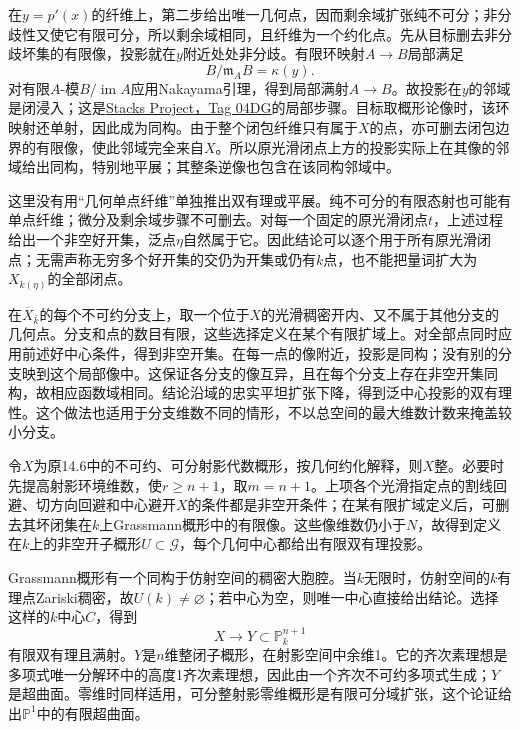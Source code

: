 在$y=p'(x)$的纤维上，第二步给出唯一几何点，因而剩余域扩张纯不可分；非分歧性又使它有限可分，所以剩余域相同，且纤维为一个约化点。先从目标删去非分歧坏集的有限像，投影就在$y$附近处处非分歧。有限环映射$A\to B$局部满足
\[
B/\mathfrak m_A B=\kappa(y).
\]
对有限$A$-模$B/\operatorname{im}A$应用Nakayama引理，得到局部满射$A\to B$。故投影在$y$的邻域是闭浸入；这是\href{https://stacks.math.columbia.edu/tag/04DG}{Stacks Project，Tag 04DG}的局部步骤。目标取概形论像时，该环映射还单射，因此成为同构。由于整个闭包纤维只有属于$X$的点，亦可删去闭包边界的有限像，使此邻域完全来自$X$。所以原光滑闭点上方的投影实际上在其像的邻域给出同构，特别地平展；其整条逆像也包含在该同构邻域中。

这里没有用“几何单点纤维”单独推出双有理或平展。纯不可分的有限态射也可能有单点纤维；微分及剩余域步骤不可删去。对每一个固定的原光滑闭点$t$，上述过程给出一个非空好开集，泛点$\eta$自然属于它。因此结论可以逐个用于所有原光滑闭点；无需声称无穷多个好开集的交仍为开集或仍有$k$点，也不能把量词扩大为$X_{k(\eta)}$的全部闭点。

在$\overline X_{\bar k}$的每个不可约分支上，取一个位于$X$的光滑稠密开内、又不属于其他分支的几何点。分支和点的数目有限，这些选择定义在某个有限扩域上。对全部点同时应用前述好中心条件，得到非空开集。在每一点的像附近，投影是同构；没有别的分支映到这个局部像中。这保证各分支的像互异，且在每个分支上存在非空开集同构，故相应函数域相同。结论沿域的忠实平坦扩张下降，得到泛中心投影的双有理性。这个做法也适用于分支维数不同的情形，不以总空间的最大维数计数来掩盖较小分支。

令$X$为原14.6中的不可约、可分射影代数概形，按几何约化解释，则$X$整。必要时先提高射影环境维数，使$r\geq n+1$，取$m=n+1$。上项各个光滑指定点的割线回避、切方向回避和中心避开$X$的条件都是非空开条件；在某有限扩域定义后，可删去其坏闭集在$k$上Grassmann概形中的有限像。这些像维数仍小于$N$，故得到定义在$k$上的非空开子概形$U\subset\mathcal G$，每个几何中心都给出有限双有理投影。

Grassmann概形有一个同构于仿射空间的稠密大胞腔。当$k$无限时，仿射空间的$k$有理点Zariski稠密，故$U(k)\ne\varnothing$；若中心为空，则唯一中心直接给出结论。选择这样的$k$中心$C$，得到
\[
X\longrightarrow Y\subset\mathbb P^{n+1}_k
\]
有限双有理且满射。$Y$是$n$维整闭子概形，在射影空间中余维1。它的齐次素理想是多项式唯一分解环中的高度1齐次素理想，因此由一个齐次不可约多项式生成；$Y$是超曲面。零维时同样适用，可分整射影零维概形是有限可分域扩张，这个论证给出$\mathbb P^1$中的有限超曲面。

